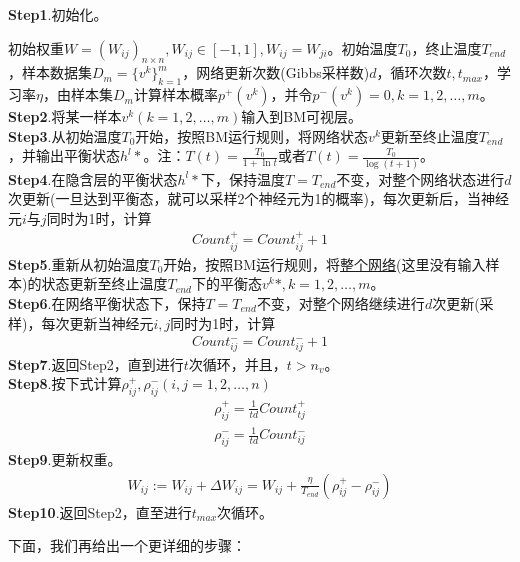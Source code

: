             \textbf{Step1}.初始化。
            \par
            初始权重$W=(W_{ij})_{n\times n},W_{ij}\in [-1,1],W_{ij} = W_{ji}$。初始温度$T_0$，终止温度$T_{end}$，样本数据集$D_m = \{v^k\}_{k=1}^m$，网络更新次数(Gibbs采样数)$d$，循环次数$t,t_{max}$，学习率$\eta$，由样本集$D_m$计算样本概率$p^+(v^k)$，并令$p^-(v^k) = 0,k=1,2,\dots,m$。\\
            \textbf{Step2}.将某一样本$v^k(k=1,2,\dots,m)$输入到BM可视层。\\
            \textbf{Step3}.从初始温度$T_0$开始，按照BM运行规则，将网络状态$v^k$更新至终止温度$T_{end}$，并输出平衡状态$h^l*$。注：$T(t) = \frac{T_0}{1+\ln t}$或者$T(t) = \frac{T_0}{\log (t+1)}$。 \\
            \textbf{Step4}.在隐含层的平衡状态$h^l*$下，保持温度$T= T_{end}$不变，对整个网络状态进行$d$次更新(一旦达到平衡态，就可以采样2个神经元为1的概率)，每次更新后，当神经元$i$与$j$同时为1时，计算
            \begin{align*}
            Count_{ij}^+ = Count_{ij}^+ +1
            \end{align*}
            \textbf{Step5}.重新从初始温度$T_0$开始，按照BM运行规则，将\underline{整个网络}(这里没有输入样本)的状态更新至终止温度$T_{end}$下的平衡态$v^k*,k=1,2,\dots,m$。\\
            \textbf{Step6}.在网络平衡状态下，保持$T= T_{end}$不变，对整个网络继续进行$d$次更新(采样)，每次更新当神经元$i,j$同时为1时，计算
            \begin{align*}
            Count_{ij}^- = Count_{ij}^-+1
            \end{align*}
            \textbf{Step7}.返回Step2，直到进行$t$次循环，并且，$t>n_v$。\\
            \textbf{Step8}.按下式计算$\rho_{ij}^+,\rho_{ij}^-(i,j=1,2,\dots,n)$
            \begin{align*}
            \rho_{ij}^+ = \frac{1}{td} Count_{tj}^+\\
            \rho_{ij}^- = \frac{1}{td} Count_{ij}^-
            \end{align*}
            \textbf{Step9}.更新权重。
            \begin{align*}
            W_{ij}:=W_{ij} + \Delta W_{ij} = W_{ij} + \frac{\eta}{T_{end}}(\rho_{ij}^+ - \rho_{ij}^-)
            \end{align*}
            \textbf{Step10}.返回Step2，直至进行$t_{max}$次循环。
            \par
            下面，我们再给出一个更详细的步骤：\\
